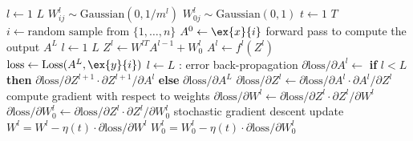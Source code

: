 \documentclass[10pt,oneside]{book}
\begin{document}
\pagestyle{empty}
\thispagestyle{empty}

\begin{codebox}
  \li     \For $l \gets 1$ \To $L$
        \Do
  \li        $W_{ij}^l \sim \text{Gaussian}(0, 1/m^l)$
  \li        $W_{0j}^l \sim \text{Gaussian}(0, 1)$
            \End
  \li \For $t \gets 1$ \To $T$
  \li   \Do
          $i \gets \text{random sample from } \{1,\ldots,n\}$
  \li     $A^0 \gets \ex{x}{i}$
  \li     \Comment forward pass to compute the output $A^L$
  \li     \For $l \gets 1$ \To $L$
  \li       \Do
              $Z^l \gets W^{lT}A^{l-1} + W_0^l$
  \li         $A^l \gets f^l(Z^l)$
            \End
  \li     $\text{loss} \gets \text{Loss}(A^L, \ex{y}{i})$
  \li     \For $l \gets L$ :
         \Do
  \li       \Comment error back-propagation
  \li       $\partial \text{loss}/\partial A^l \gets$ {\bf if} $l < L$ {\bf then}
            $\partial \text{loss}/\partial Z^{l+1}\cdot 
            \partial Z^{l+1}/\partial A^l$ {\bf else} $ \partial \text{loss}/\partial A^L$
  \li       $\partial \text{loss}/\partial Z^l \gets \partial
  \text{loss}/\partial A^l \cdot \partial A^l/\partial Z^l$
  \li       \Comment compute gradient with respect to weights
  \li       $\partial \text{loss}/\partial W^l \gets \partial \text{loss}/\partial Z^l\cdot \partial Z^l/\partial W^l$
  \li       $\partial \text{loss}/\partial W_0^l \gets \partial \text{loss}/\partial Z^l \cdot \partial Z^l/\partial W_0^l$
  \li       \Comment stochastic gradient descent update
  \li       $W^l = W^l - \eta(t)\cdot \partial \text{loss}/\partial W^l$
  \li       $W^l_0 = W_0^l - \eta(t)\cdot \partial \text{loss}/\partial W_0^l$
        \End
\end{codebox}
\end{document}
